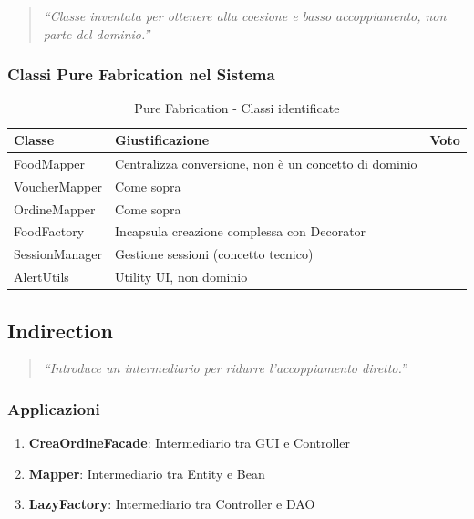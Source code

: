 \documentclass[12pt,a4paper]{article}
\newcommand{\ok}{\textcolor{okgreen}{\checkmark}}
\begin{document}
\begin{quote}
\textit{``Classe inventata per ottenere alta coesione e basso accoppiamento, non parte del dominio.''}
\end{quote}

\subsubsection{Classi Pure Fabrication nel Sistema}

\begin{table}[h]
\centering
\begin{tabular}{|l|p{6cm}|c|}
\hline
\textbf{Classe} & \textbf{Giustificazione} & \textbf{Voto} \\
\hline
FoodMapper & Centralizza conversione, non è un concetto di dominio & \ok \\
\hline
VoucherMapper & Come sopra & \ok \\
\hline
OrdineMapper & Come sopra & \ok \\
\hline
FoodFactory & Incapsula creazione complessa con Decorator & \ok \\
\hline
SessionManager & Gestione sessioni (concetto tecnico) & \ok \\
\hline
AlertUtils & Utility UI, non dominio & \ok \\
\hline
\end{tabular}
\caption{Pure Fabrication - Classi identificate}
\end{table}

\subsection{Indirection}

\begin{quote}
\textit{``Introduce un intermediario per ridurre l'accoppiamento diretto.''}
\end{quote}

\subsubsection{Applicazioni}

\begin{enumerate}
    \item \textbf{CreaOrdineFacade}: Intermediario tra GUI e Controller
    \item \textbf{Mapper}: Intermediario tra Entity e Bean
    \item \textbf{LazyFactory}: Intermediario tra Controller e DAO
\end{enumerate}
\end{document}
